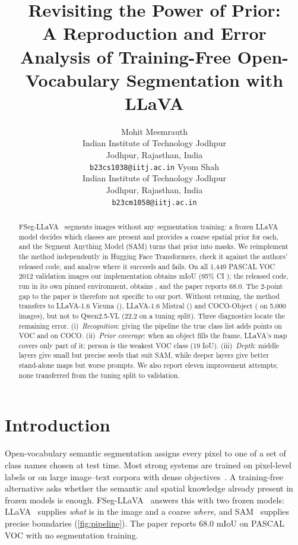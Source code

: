 \documentclass{article}
\title{Revisiting the Power of Prior:\\ A Reproduction and Error Analysis of
Training-Free Open-Vocabulary Segmentation with LLaVA}
\author{%
  Mohit Meemrauth\\
  Indian Institute of Technology Jodhpur\\
  Jodhpur, Rajasthan, India\\
  \texttt{b23cs1038@iitj.ac.in}
  \And
  Vyom Shah\\
  Indian Institute of Technology Jodhpur\\
  Jodhpur, Rajasthan, India\\
  \texttt{b23cm1058@iitj.ac.in}
}
\newcommand{\method}{FSeg-LLaVA}
\newcommand{\miou}{mIoU}
\begin{document}
\maketitle

\begin{abstract}
\method{}~\citep{zhang2026prior} segments images without any segmentation training: a frozen LLaVA
model decides which classes are present and provides a coarse spatial prior for each, and the Segment
Anything Model (SAM) turns that prior into masks. We reimplement the method independently in Hugging
Face Transformers, check it against the authors' released code, and analyse where it succeeds and
fails. On all 1,449 PASCAL VOC 2012 validation images our implementation obtains \miouOurs{} \miou{}
(95\% CI \ciOurs{}); the released code, run in its own pinned environment, obtains \miouOfficial{},
and the paper reports 68.0. The 2-point gap to the paper is therefore not specific to our port.
Without retuning, the method transfers to LLaVA-1.6 Vicuna (\miouVic{}), LLaVA-1.6 Mistral
(\miouMis{}) and COCO-Object (\miouCoco{} on 5,000 images), but not to Qwen2.5-VL (22.2 on a tuning
split). Three diagnostics locate the remaining error. (i)~\emph{Recognition}: giving the pipeline the
true class list adds \dOracle{} points on VOC and \dCocoOracle{} on COCO. (ii)~\emph{Prior coverage}:
when an object fills the frame, LLaVA's map covers only part of it; person is the weakest VOC class
(19 IoU). (iii)~\emph{Depth}: middle layers give small but precise seeds that suit SAM, while deeper
layers give better stand-alone maps but worse prompts. We also report eleven improvement attempts;
none transferred from the tuning split to validation.
\end{abstract}

\section{Introduction}
\label{sec:intro}
Open-vocabulary semantic segmentation assigns every pixel to one of a set of class names chosen at
test time. Most strong systems are trained on pixel-level labels or on large image--text corpora with
dense objectives~\citep{li2022lseg,ghiasi2022openseg,liang2023ovseg,xu2022groupvit,cha2023tcl}. A
training-free alternative asks whether the semantic and spatial knowledge already present in frozen
models is enough. \method{}~\citep{zhang2026prior} answers this with two frozen models:
LLaVA~\citep{liu2023llava,liu2024improved} supplies \emph{what} is in the image and a coarse
\emph{where}, and SAM~\citep{kirillov2023sam} supplies precise boundaries (\cref{fig:pipeline}). The
paper reports 68.0 \miou{} on PASCAL VOC with no segmentation training.
\end{document}
